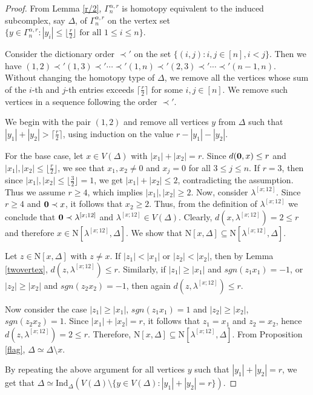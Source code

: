 \documentclass{amsart}
\theoremstyle{definition}
\theoremstyle{remark}
\numberwithin{equation}{section}
\newcommand{\D}{\Delta}
\newcommand{\f}{\lfloor\frac{r}{2}\rfloor}
\newcommand{\cil}{\lceil\frac{r}{2}\rceil}
\def\n{{\mathrm{N}}}
\begin{document}
\begin{proof}
	From Lemma \ref{r/2},  $\Gamma_n^{\alpha, r}$ is homotopy equivalent to the induced subcomplex, say $\D$, of $\Gamma_n^{\alpha, r}$ on the vertex set $\{y \in \Gamma_n^{\alpha, r} : |y_i| \leq \f \text{ for all } 1 \leq i \leq n\}$.
	
	Consider the dictionary order $\prec'$ on the set $\{(i,j): i,j \in [n], i < j\}$. Then we have $(1,2) \prec' (1,3) \prec' \cdots \prec' (1,n) \prec' (2,3) \prec' \cdots \prec' (n-1,n)$.   Without changing the homotopy type of $\Delta$, we remove all the vertices whose sum of the $i$-th and $j$-th entries exceeds $\cil$ for some $i, j \in [n]$. We remove such vertices in a sequence following the order $\prec'$.
	
	We begin with the pair $(1,2)$ and remove all vertices $y$ from $\D$ such that $|y_1| + |y_2| > \cil$, using induction on the value $r - |y_1| - |y_2|$.
	
	For the base case, let $x \in V(\D)$ with $|x_1| + |x_2| = r$. Since $d({\bf{0}}, x) \leq r$ and $|x_1|,|x_2|\leq \f$, we see that $x_1, x_2 \neq 0$ and $x_j = 0$ for all $3 \leq j \leq n$. If $r = 3$, then since  $|x_1|, |x_2| \leq \lfloor{\frac{3}{2}}\rfloor = 1$, we get  $|x_1| + |x_2| \leq 2$, contradicting the assumption. Thus we assume $r \geq 4$, which implies $|x_1|, |x_2| \geq 2$.
	Now, consider $\lambda^{[x;12]}$. Since $r \geq 4$ and ${\bf{0}} \prec x$, it follows that $x_2\geq 2$. Thus, from the definition of $\lambda^{[x;12]}$ we conclude that ${\bf{0}} \prec \lambda^{[x;12]}$ and $\lambda^{[x;12]} \in V(\Delta)$. Clearly, $d(x, \lambda^{[x;12]}) = 2 \leq r$ and therefore  $x \in \n[\lambda^{[x;12]}, \D]$.  We show that $\n[x, \D]  \subseteq \n[\lambda^{[x;12]}, \D]$.
	
	Let $z \in \n[x, \D]$ with $z \neq x$. If $|z_1| < |x_1|$ or $|z_2| < |x_2|$, then by Lemma \ref{twovertex}, $d(z, \lambda^{[x;12]}) \leq r$. Similarly, if $|z_1| \geq |x_1|$ and $sgn(z_1 x_1) = -1$, or $|z_2| \geq |x_2|$ and $sgn(z_2 x_2) = -1$, then again $d(z, \lambda^{[x;12]}) \leq r$. 
	
	
	Now consider the case $|z_1| \geq |x_1|$, $sgn(z_1 x_1) = 1$ and  $|z_2| \geq |x_2|$, $sgn(z_2 x_2) = 1$. Since $|x_1| + |x_2| = r$, it follows that $z_1 = x_1$ and $z_2 = x_2$, hence $d(z, \lambda^{[x;12]}) = 2 \leq r$. Therefore, $\n[x, \D] \subseteq \n[\lambda^{[x;12]}, \D]$. From Proposition \ref{flag}, $\D \simeq \D \setminus x$. 
	
	By repeating the above argument for all vertices $y$ such that $|y_1| + |y_2| = r$,  we get that 
	$
	\Delta \simeq \mathrm{Ind}_{\Delta}(V(\Delta) \setminus \{y\in V(\D) : |y_1|+ |y_2| = r\}).$
	

\end{proof}
\end{document}
